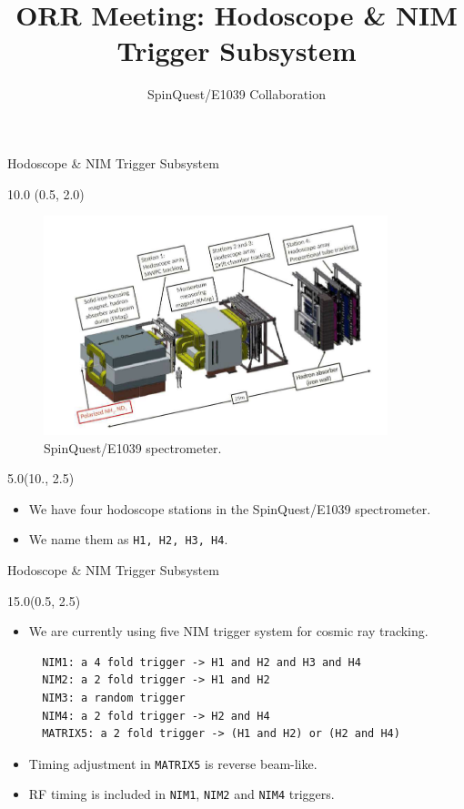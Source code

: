 \documentclass[12pt, xcolor={dvipsnames}, aspectratio = 169, sans,mathserif]{beamer}
\title{ORR Meeting: Hodoscope \& NIM Trigger Subsystem}
\author{SpinQuest/E1039 Collaboration}
\newenvironment{List}[2]
{
\begin{textblock}{#1}#2
\begin{itemize}
}
{
\end{itemize}
\end{textblock}
}
\newenvironment{Pic}[2]
{
\begin{textblock}{#1} #2
\begin{figure}
}
{
\end{figure}
\end{textblock}
}
\begin{document}
%
%
\begin{frame}
  \maketitle
\end{frame}

%
%
\begin{frame}[fragile]{Hodoscope \& NIM Trigger Subsystem}
\begin{Pic}{10.0}{(0.5, 2.0)}
  \includegraphics[width=10.0cm]{imgs/spectrometer.png}
  \caption{SpinQuest/E1039 spectrometer.}
\end{Pic}

\begin{List}{5.0}{(10., 2.5)}

  \item We have four hodoscope stations in the SpinQuest/E1039 spectrometer.

  \item We name them as \verb|H1, H2, H3, H4|.

\end{List}

\end{frame}

\begin{frame}[fragile]{Hodoscope \& NIM Trigger Subsystem}
\begin{List}{15.0}{(0.5, 2.5)}

  \item We are currently using five NIM trigger system for cosmic ray tracking.

  \begin{verbatim}
  NIM1: a 4 fold trigger -> H1 and H2 and H3 and H4
  NIM2: a 2 fold trigger -> H1 and H2
  NIM3: a random trigger
  NIM4: a 2 fold trigger -> H2 and H4
  MATRIX5: a 2 fold trigger -> (H1 and H2) or (H2 and H4)
  \end{verbatim}

  \item Timing adjustment in \verb|MATRIX5| is reverse beam-like.

  \item RF timing is included in \verb|NIM1|, \verb|NIM2| and \verb|NIM4| triggers.

\end{List}
\end{frame}
\end{document}
